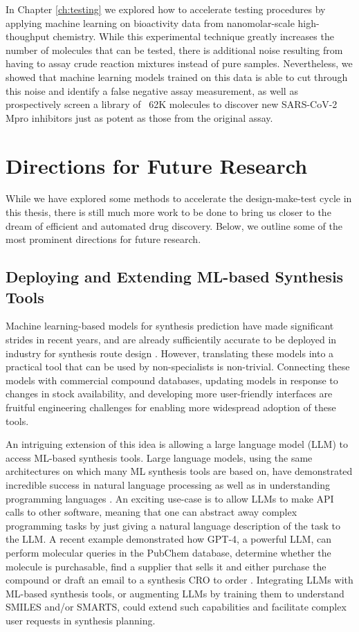 In Chapter \ref{ch:testing} we explored how to accelerate testing procedures by applying machine learning on bioactivity data from nanomolar-scale high-thoughput chemistry. While this experimental technique greatly increases the number of molecules that can be tested, there is additional noise resulting from having to assay crude reaction mixtures instead of pure samples. Nevertheless, we showed that machine learning models trained on this data is able to cut through this noise and identify a false negative assay measurement, as well as prospectively screen a library of ~62K molecules to discover new SARS-CoV-2 Mpro inhibitors just as potent as those from the original assay.

\section{Directions for Future Research}

While we have explored some methods to accelerate the design-make-test cycle in this thesis, there is still much more work to be done to bring us closer to the dream of efficient and automated drug discovery. Below, we outline some of the most prominent directions for future research.

\subsection{Deploying and Extending ML-based Synthesis Tools}
Machine learning-based models for synthesis prediction have made significant strides in recent years, and are already sufficientily accurate to be deployed in industry for synthesis route design \cite{Tu2023deployment}. However, translating these models into a practical tool that can be used by non-specialists is non-trivial. Connecting these models with commercial compound databases, updating models in response to changes in stock availability, and developing more user-friendly interfaces are fruitful engineering challenges for enabling more widespread adoption of these tools.

An intriguing extension of this idea is allowing a large language model (LLM) to access ML-based synthesis tools. Large language models, using the same architectures on which many ML synthesis tools are based on, have demonstrated incredible success in natural language processing as well as in understanding programming languages \cite{OpenAI2021GPT3,Chowdhery2022Palm, Touvron2023Llama}. An exciting use-case is to allow LLMs to make API calls to other software, meaning that one can abstract away complex programming tasks by just giving a natural language description of the task to the LLM. A recent example demonstrated how GPT-4, a powerful LLM, can perform molecular queries in the PubChem database, determine whether the molecule is purchasable, find a supplier that sells it and either purchase the compound or draft an email to a synthesis CRO to order \cite{OpenAI2023GPT4}. Integrating LLMs with ML-based synthesis tools, or augmenting LLMs by training them to understand SMILES and/or SMARTS, could extend such capabilities and facilitate complex user requests in synthesis planning.


